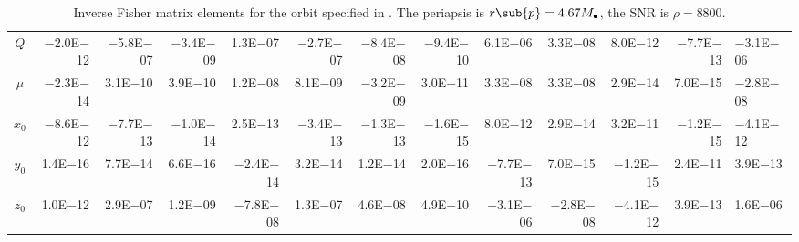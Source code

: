 \begin{sidewaystable}[htbp]
\begin{tabular}{crrrrrrrrrrr}
$Q$ & $-$2.0E$-$12 & $-$5.8E$-$07 & $-$3.4E$-$09 & 1.3E$-$07 & $-$2.7E$-$07 & $-$8.4E$-$08 & $-$9.4E$-$10 & 6.1E$-$06 & 3.3E$-$08 & 8.0E$-$12 & $-$7.7E$-$13 & $-$3.1E$-$06 \\
$\mu$ & $-$2.3E$-$14 & 3.1E$-$10 & 3.9E$-$10 & 1.2E$-$08 & 8.1E$-$09 & $-$3.2E$-$09 & 3.0E$-$11 & 3.3E$-$08 & 3.3E$-$08 & 2.9E$-$14 & 7.0E$-$15 & $-$2.8E$-$08 \\
$x_0$ & $-$8.6E$-$12 & $-$7.7E$-$13 & $-$1.0E$-$14 & 2.5E$-$13 & $-$3.4E$-$13 & $-$1.3E$-$13 & $-$1.6E$-$15 & 8.0E$-$12 & 2.9E$-$14 & 3.2E$-$11 & $-$1.2E$-$15 & $-$4.1E$-$12 \\
$y_0$ & 1.4E$-$16 & 7.7E$-$14 & 6.6E$-$16 & $-$2.4E$-$14 & 3.2E$-$14 & 1.2E$-$14 & 2.0E$-$16 & $-$7.7E$-$13 & 7.0E$-$15 & $-$1.2E$-$15 & 2.4E$-$11 & 3.9E$-$13 \\
$z_0$ & 1.0E$-$12 & 2.9E$-$07 & 1.2E$-$09 & $-$7.8E$-$08 & 1.3E$-$07 & 4.6E$-$08 & 4.9E$-$10 & $-$3.1E$-$06 & $-$2.8E$-$08 & $-$4.1E$-$12 & 3.9E$-$13 & 1.6E$-$06 \\
\bottomrule
\end{tabular}
\caption{Inverse Fisher matrix elements for the orbit specified in . The periapsis is $r\sub{p} = 4.67 M_\bullet$, the SNR is $\rho = 8800$.}
\label{tab:Fisher_1}
\end{sidewaystable}
